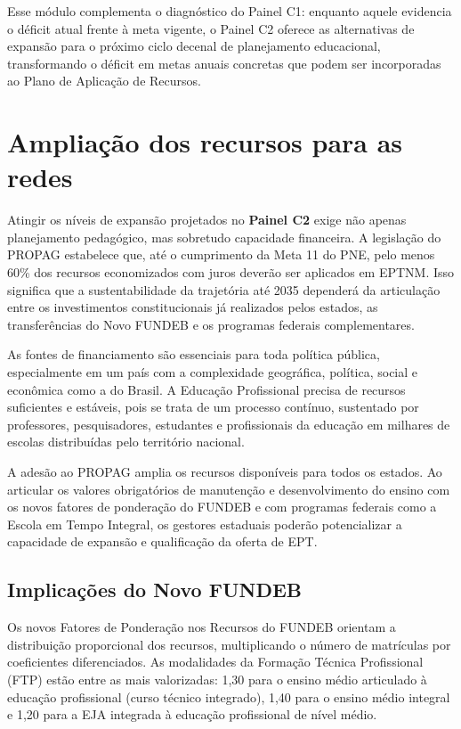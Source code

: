 Esse módulo complementa o diagnóstico do Painel C1: enquanto aquele evidencia o déficit atual frente à meta vigente, o Painel C2 oferece as alternativas de expansão para o próximo ciclo decenal de planejamento educacional, transformando o déficit em metas anuais concretas que podem ser incorporadas ao Plano de Aplicação de Recursos.


\section{Ampliação dos recursos para as redes}

Atingir os níveis de expansão projetados no \textbf{Painel C2} exige não apenas planejamento pedagógico, mas sobretudo capacidade financeira. A legislação do PROPAG estabelece que, até o cumprimento da Meta 11 do PNE, pelo menos 60\% dos recursos economizados com juros deverão ser aplicados em EPTNM. Isso significa que a sustentabilidade da trajetória até 2035 dependerá da articulação entre os investimentos constitucionais já realizados pelos estados, as transferências do Novo FUNDEB e os programas federais complementares.

As fontes de financiamento são essenciais para toda política pública, especialmente em um país com a complexidade geográfica, política, social e econômica como a do Brasil. A Educação Profissional precisa de recursos suficientes e estáveis, pois se trata de um processo contínuo, sustentado por professores, pesquisadores, estudantes e profissionais da educação em milhares de escolas distribuídas pelo território nacional.

A adesão ao PROPAG amplia os recursos disponíveis para todos os estados. Ao articular os valores obrigatórios de manutenção e desenvolvimento do ensino com os novos fatores de ponderação do FUNDEB e com programas federais como a Escola em Tempo Integral, os gestores estaduais poderão potencializar a capacidade de expansão e qualificação da oferta de EPT.

\subsection{Implicações do Novo FUNDEB}

Os novos Fatores de Ponderação nos Recursos do FUNDEB orientam a distribuição proporcional dos recursos, multiplicando o número de matrículas por coeficientes diferenciados. As modalidades da Formação Técnica Profissional (FTP) estão entre as mais valorizadas: 1,30 para o ensino médio articulado à educação profissional (curso técnico integrado), 1,40 para o ensino médio integral e 1,20 para a EJA integrada à educação profissional de nível médio. 

